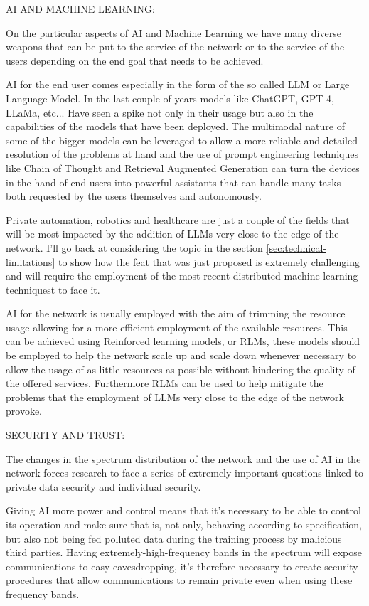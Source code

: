 \bigskip
\noindent
AI AND MACHINE LEARNING:
\label{ssec:ai-ml}

On the particular aspects of AI and Machine Learning we have many diverse weapons that can be put to
the service of the network or to the service of the users depending on the end goal that needs to
be achieved.

AI for the end user comes especially in the form of the so called LLM or Large Language Model. In
the last couple of years models like ChatGPT, GPT-4, LLaMa, etc... Have seen a spike not only in
their usage but also in the capabilities of the models that have been deployed. The multimodal nature of some of the bigger models can be leveraged to allow a more reliable and detailed resolution of the problems at hand and the use of prompt engineering techniques like Chain of Thought and Retrieval Augmented Generation can turn the devices in the hand of end users into powerful assistants that can handle many tasks both requested by the users themselves and autonomously.

Private automation, robotics and healthcare are just a couple of the fields that will be most
impacted by the addition of LLMs very close to the edge of the network. I'll go back at considering
the topic in the section \ref{sec:technical-limitations} to show how the feat that was just proposed
is extremely challenging and will require the employment of the most recent distributed machine
learning techniquest to face it.

AI for the network is usually employed with the aim of trimming the resource usage allowing for a
more efficient employment of the available resources. This can be achieved using Reinforced learning models, or RLMs, these models should be
employed to help the network scale up and scale down whenever necessary to allow the usage of as
little resources as possible without hindering the quality of the offered services. Furthermore RLMs can be
used to help mitigate the problems that the employment of LLMs very close to the edge of the network
provoke.

\bigskip
\noindent
SECURITY AND TRUST:
\label{ssec:security-trust}

The changes in the spectrum distribution of the network and the use of AI in the network forces
research to face a series of extremely important questions linked to private data security and
individual security. 

Giving AI more power and control means that it's necessary to be able to
control its operation and make sure that is, not only, behaving according to specification, but also
not being fed polluted data during the training process by malicious third parties. Having extremely-high-frequency bands in the spectrum will expose communications to easy
eavesdropping, it's therefore necessary to create security procedures that allow communications to
remain private even when using these frequency bands.

